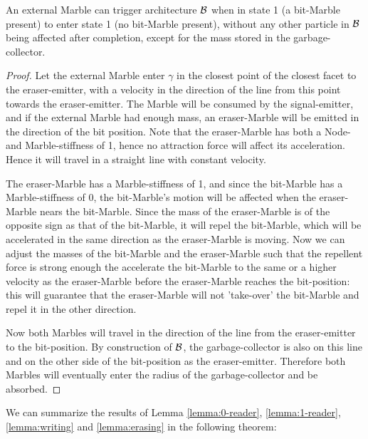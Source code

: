 \begin{lemma}
    An external Marble can trigger architecture $\mathcal{B}$ when in state 1 (a bit-Marble present) to enter state 1 (no bit-Marble present), without any other particle in $\mathcal{B}$ being affected after completion, except for the mass stored in the garbage-collector.
    \label{lemma:erasing}
\end{lemma}
\begin{proof}
    Let the external Marble enter $\gamma$ in the closest point of the closest facet to the eraser-emitter, with a velocity in the direction of the line from this point towards the eraser-emitter. The Marble will be consumed by the signal-emitter, and if the external Marble had enough mass, an eraser-Marble will be emitted in the direction of the bit position. Note that the eraser-Marble has both a Node- and Marble-stiffness of 1, hence no attraction force will affect its acceleration. Hence it will travel in a straight line with constant velocity.
    
    The eraser-Marble has a Marble-stiffness of 1, and since the bit-Marble has a Marble-stiffness of 0, the bit-Marble's motion will be affected when the eraser-Marble nears the bit-Marble. Since the mass of the eraser-Marble is of the opposite sign as that of the bit-Marble, it will repel the bit-Marble, which will be accelerated in the same direction as the eraser-Marble is moving. Now we can adjust the masses of the bit-Marble and the eraser-Marble such that the repellent force is strong enough the accelerate the bit-Marble to the same or a higher velocity as the eraser-Marble before the eraser-Marble reaches the bit-position: this will guarantee that the eraser-Marble will not 'take-over' the bit-Marble and repel it in the other direction.
    
    Now both Marbles will travel in the direction of the line from the eraser-emitter to the bit-position. By construction of $\mathcal{B}$, the garbage-collector is also on this line and on the other side of the bit-position as the eraser-emitter. Therefore both Marbles will eventually enter the radius of the garbage-collector and be absorbed.
\end{proof}

We can summarize the results of Lemma \ref{lemma:0-reader}, \ref{lemma:1-reader}, \ref{lemma:writing} and \ref{lemma:erasing} in the following theorem:

